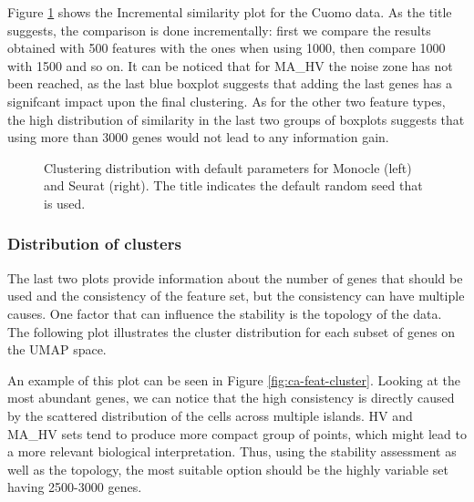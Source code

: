 Figure \ref{fig:ca-feat-comp} shows the Incremental similarity plot for the Cuomo data. As the title suggests, the comparison is done incrementally: first we compare the results obtained with 500 features with the ones when using 1000, then compare 1000 with 1500 and so on. It can be noticed that for MA\_HV the noise zone has not been reached, as the last blue boxplot suggests that adding the last genes has a signifcant impact upon the final clustering. As for the other two feature types, the high distribution of similarity in the last two groups of boxplots suggests that using more than 3000 genes would not lead to any information gain.

\begin{figure}[H]
    \centering
    \caption{\label{fig:ca-feat-comp}Clustering distribution with default parameters for Monocle (left) and Seurat (right). The title indicates the default random seed that is used.}
\end{figure}

\subsubsection{Distribution of clusters}
The last two plots provide information about the number of genes that should be used and the consistency of the feature set, but the consistency can have multiple causes. One factor that can influence the stability is the topology of the data. The following plot illustrates the cluster distribution for each subset of genes on the UMAP space.

An example of this plot can be seen in Figure \ref{fig:ca-feat-cluster}. Looking at the most abundant genes, we can notice that the high consistency is directly caused by the scattered distribution of the cells across multiple islands. HV and MA\_HV sets tend to produce more compact group of points, which might lead to a more relevant biological interpretation. Thus, using the stability assessment as well as the topology, the most suitable option should be the highly variable set having 2500-3000 genes.

